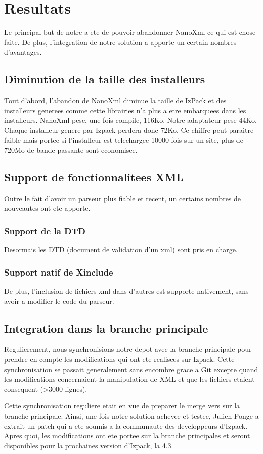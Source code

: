 \section{Resultats}
Le principal but de notre a ete de pouvoir abandonner NanoXml ce qui est chose faite. De plus, l'integration de notre solution a apporte un certain nombres d'avantages.
\subsection{Diminution de la taille des installeurs}
Tout d'abord, l'abandon de NanoXml diminue la taille de IzPack et des installeurs generees comme cette librairies n'a plus a etre embarquees dans les installeurs. NanoXml pese, une fois compile, 116Ko. Notre adaptateur pese 44Ko. Chaque installeur genere par Izpack perdera donc 72Ko. Ce chiffre peut paraitre faible mais portee si l'installeur est telechargee 10000 fois sur un site, plus de 720Mo de bande passante sont economisee.
\subsection{Support de fonctionnalitees XML}
Outre le fait d'avoir un parseur plus fiable et recent, un certains nombres de nouveautes ont ete apporte.
\subsubsection{Support de la DTD}
Desormais les DTD (document de validation d'un xml) sont pris en charge.
\subsubsection{Support natif de Xinclude}
De plus, l'inclusion de fichiers xml dans d'autres est supporte nativement, sans avoir a modifier le code du parseur.
\subsection{Integration dans la branche principale}
Regulierement, nous synchronisions notre depot avec la branche principale pour prendre en compte les modifications qui ont ete realisees sur Izpack. Cette synchronisation se passait generalement sans encombre grace a Git excepte quand les modifications concernaient la manipulation de XML et que les fichiers etaient consequent (>3000 lignes).

Cette synchronisation reguliere etait en vue de preparer le merge vers sur la branche principale. Ainsi, une fois notre solution achevee et testee, Julien Ponge a extrait un patch qui a ete soumis a la communaute des developpeurs d'Izpack. Apres quoi, les modifications ont ete portee sur la branche principales et seront disponibles pour la prochaines version d'Izpack, la 4.3.
